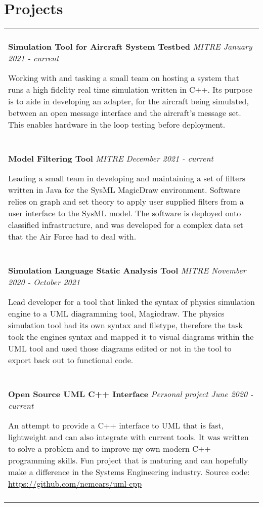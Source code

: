 \documentclass[10pt]{article}
\begin{document}
\section*{Projects}
\begin{tabular}{p{18.5cm}}
    \hline
    \multicolumn{1}{c}{} \\

    \large \textbf{Simulation Tool for Aircraft System Testbed} \normalsize \textit{MITRE \hfill January 2021 - current}

    \> Working with and tasking a small team on hosting a system that runs a high fidelity real time 
    simulation written in C++. Its purpose is to aide in developing an adapter, for the aircraft being simulated, between an open
    message interface and the aircraft's message set. This enables hardware in the loop testing before deployment.\\
    \multicolumn{1}{c}{} \\

    \large \textbf{Model Filtering Tool} \normalsize \textit{MITRE \hfill December 2021 - current}  

    \> Leading a small team in developing and maintaining a set of filters written in Java for the SysML MagicDraw environment. Software relies on 
    graph and set theory to apply user supplied filters from a user interface to the SysML model. The software is deployed onto classified 
    infrastructure, and was developed for a complex data set that the Air Force had to deal with.\\
    \multicolumn{1}{c}{} \\

    \large \textbf{Simulation Language Static Analysis Tool} \normalsize \textit{MITRE \hfill November 2020 - October 2021}  

    \> Lead developer for a tool that linked the syntax of physics simulation engine to a UML diagramming tool, Magicdraw. 
    The physics simulation tool had its own syntax and filetype, therefore the task took the engines syntax and mapped it 
    to visual diagrams within the UML tool and used those diagrams edited or not in the tool to export back out to functional code. \\
    \multicolumn{1}{c}{} \\

    \large \textbf{Open Source UML C++ Interface} \normalsize \textit{Personal project \hfill June 2020 - current}  

    \> An attempt to provide a C++ interface to UML that is fast, lightweight and can also integrate with current tools. It was written 
    to solve a problem and to improve my own modern C++ programming skills. Fun project that is maturing and can hopefully make a 
    difference in the Systems Engineering industry. Source code: \url{https://github.com/nemears/uml-cpp} \\
    \multicolumn{1}{c}{} \\


\end{tabular}
\end{document}
